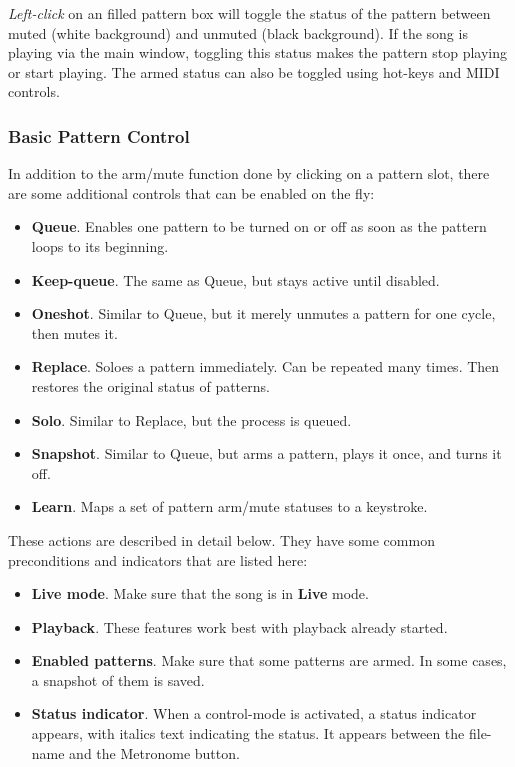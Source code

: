    \textsl{Left-click} on an filled pattern box will toggle the status of the
   pattern between muted (white background) and unmuted (black background).
   If the song is playing via the main window, toggling this status makes
   the pattern stop playing or start playing.  The armed status
   can also be toggled using hot-keys and MIDI controls.

\subsubsection{Basic Pattern Control}
\label{subsubsec:patterns_basic_pattern_control}

   In addition to the arm/mute function done by clicking on a pattern slot,
   there are some additional controls that can be enabled on the fly:

   \begin{itemize}
      \item \textbf{Queue}.
         Enables one pattern to be turned on or off as soon as the pattern
         loops to its beginning.
      \item \textbf{Keep-queue}.
         The same as Queue, but stays active until disabled.
      \item \textbf{Oneshot}.
         Similar to Queue, but it merely unmutes a pattern for one cycle,
         then mutes it.
      \item \textbf{Replace}.
         Soloes a pattern immediately.
         Can be repeated many times.
         Then restores the original status of patterns.
      \item \textbf{Solo}.
         Similar to Replace, but the process is queued.
      \item \textbf{Snapshot}.
         Similar to Queue, but arms a pattern, plays it once, and turns it
         off.
      \item \textbf{Learn}.
         Maps a set of pattern arm/mute statuses to a keystroke.
   \end{itemize}

   These actions are described in detail below.
   They have some common preconditions and indicators that are listed here:

   \begin{itemize}
      \item \textbf{Live mode}.
         Make sure that the song is in \textbf{Live} mode.
      \item \textbf{Playback}.
         These features work best with playback already started.
      \item \textbf{Enabled patterns}.
         Make sure that some patterns are armed.
         In some cases, a snapshot of them is saved.
      \item \textbf{Status indicator}.
         When a control-mode is activated, a status indicator appears, with
         italics text indicating the status. It appears between the
         file-name and the Metronome button.
   \end{itemize}

